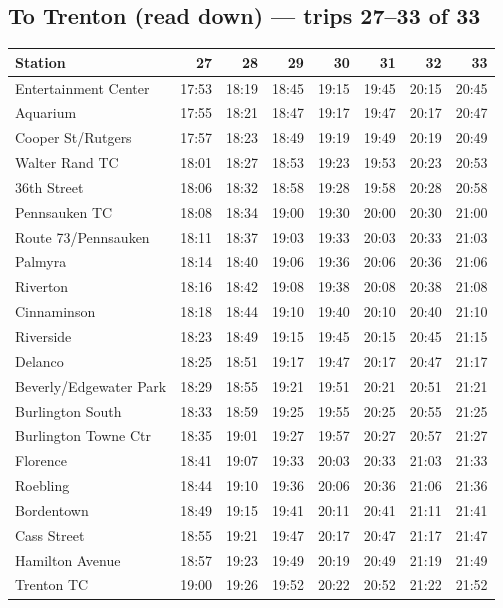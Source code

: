 \subsection*{To Trenton (read down) --- trips 27--33 of 33}
\begin{center}\footnotesize\setlength{\tabcolsep}{3pt}\begin{tabular}{@{}lrrrrrrr@{}}\toprule
Station & 27 & 28 & 29 & 30 & 31 & 32 & 33 \\\midrule
Entertainment Center & 17:53 & 18:19 & 18:45 & 19:15 & 19:45 & 20:15 & 20:45 \\
Aquarium & 17:55 & 18:21 & 18:47 & 19:17 & 19:47 & 20:17 & 20:47 \\
Cooper St/Rutgers & 17:57 & 18:23 & 18:49 & 19:19 & 19:49 & 20:19 & 20:49 \\
Walter Rand TC & 18:01 & 18:27 & 18:53 & 19:23 & 19:53 & 20:23 & 20:53 \\
36th Street & 18:06 & 18:32 & 18:58 & 19:28 & 19:58 & 20:28 & 20:58 \\
Pennsauken TC & 18:08 & 18:34 & 19:00 & 19:30 & 20:00 & 20:30 & 21:00 \\
Route 73/Pennsauken & 18:11 & 18:37 & 19:03 & 19:33 & 20:03 & 20:33 & 21:03 \\
Palmyra & 18:14 & 18:40 & 19:06 & 19:36 & 20:06 & 20:36 & 21:06 \\
Riverton & 18:16 & 18:42 & 19:08 & 19:38 & 20:08 & 20:38 & 21:08 \\
Cinnaminson & 18:18 & 18:44 & 19:10 & 19:40 & 20:10 & 20:40 & 21:10 \\
Riverside & 18:23 & 18:49 & 19:15 & 19:45 & 20:15 & 20:45 & 21:15 \\
Delanco & 18:25 & 18:51 & 19:17 & 19:47 & 20:17 & 20:47 & 21:17 \\
Beverly/Edgewater Park & 18:29 & 18:55 & 19:21 & 19:51 & 20:21 & 20:51 & 21:21 \\
Burlington South & 18:33 & 18:59 & 19:25 & 19:55 & 20:25 & 20:55 & 21:25 \\
Burlington Towne Ctr & 18:35 & 19:01 & 19:27 & 19:57 & 20:27 & 20:57 & 21:27 \\
Florence & 18:41 & 19:07 & 19:33 & 20:03 & 20:33 & 21:03 & 21:33 \\
Roebling & 18:44 & 19:10 & 19:36 & 20:06 & 20:36 & 21:06 & 21:36 \\
Bordentown & 18:49 & 19:15 & 19:41 & 20:11 & 20:41 & 21:11 & 21:41 \\
Cass Street & 18:55 & 19:21 & 19:47 & 20:17 & 20:47 & 21:17 & 21:47 \\
Hamilton Avenue & 18:57 & 19:23 & 19:49 & 20:19 & 20:49 & 21:19 & 21:49 \\
Trenton TC & 19:00 & 19:26 & 19:52 & 20:22 & 20:52 & 21:22 & 21:52 \\
\bottomrule\end{tabular}\end{center}
